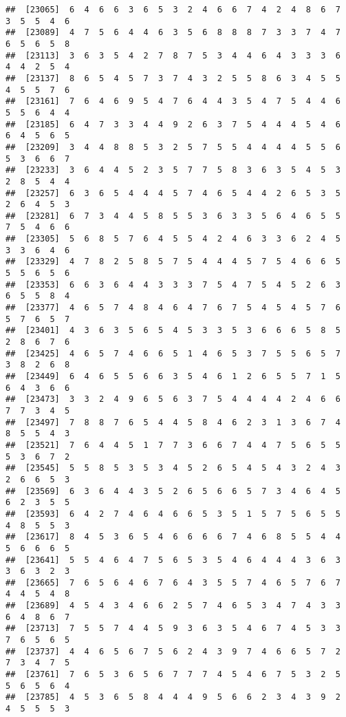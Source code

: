 \documentclass[
]{book}
\begin{document}
\begin{verbatim}
##  [23065]  6  4  6  6  3  6  5  3  2  4  6  6  7  4  2  4  8  6  7  3  5  5  4  6
##  [23089]  4  7  5  6  4  4  6  3  5  6  8  8  8  7  3  3  7  4  7  6  5  6  5  8
##  [23113]  3  6  3  5  4  2  7  8  7  5  3  4  4  6  4  3  3  3  6  4  4  2  5  4
##  [23137]  8  6  5  4  5  7  3  7  4  3  2  5  5  8  6  3  4  5  5  4  5  5  7  6
##  [23161]  7  6  4  6  9  5  4  7  6  4  4  3  5  4  7  5  4  4  6  5  5  6  4  4
##  [23185]  6  4  7  3  3  4  4  9  2  6  3  7  5  4  4  4  5  4  6  6  4  5  6  5
##  [23209]  3  4  4  8  8  5  3  2  5  7  5  5  4  4  4  4  5  5  6  5  3  6  6  7
##  [23233]  3  6  4  4  5  2  3  5  7  7  5  8  3  6  3  5  4  5  3  2  8  5  4  4
##  [23257]  6  3  6  5  4  4  4  5  7  4  6  5  4  4  2  6  5  3  5  2  6  4  5  3
##  [23281]  6  7  3  4  4  5  8  5  5  3  6  3  3  5  6  4  6  5  5  7  5  4  6  6
##  [23305]  5  6  8  5  7  6  4  5  5  4  2  4  6  3  3  6  2  4  5  3  3  6  4  6
##  [23329]  4  7  8  2  5  8  5  7  5  4  4  4  5  7  5  4  6  6  5  5  5  6  5  6
##  [23353]  6  6  3  6  4  4  3  3  3  7  5  4  7  5  4  5  2  6  3  6  5  5  8  4
##  [23377]  4  6  5  7  4  8  4  6  4  7  6  7  5  4  5  4  5  7  6  5  7  6  5  7
##  [23401]  4  3  6  3  5  6  5  4  5  3  3  5  3  6  6  6  5  8  5  2  8  6  7  6
##  [23425]  4  6  5  7  4  6  6  5  1  4  6  5  3  7  5  5  6  5  7  3  8  2  6  8
##  [23449]  6  4  6  5  5  6  6  3  5  4  6  1  2  6  5  5  7  1  5  6  4  3  6  6
##  [23473]  3  3  2  4  9  6  5  6  3  7  5  4  4  4  4  2  4  6  6  7  7  3  4  5
##  [23497]  7  8  8  7  6  5  4  4  5  8  4  6  2  3  1  3  6  7  4  8  5  5  4  3
##  [23521]  7  6  4  4  5  1  7  7  3  6  6  7  4  4  7  5  6  5  5  5  3  6  7  2
##  [23545]  5  5  8  5  3  5  3  4  5  2  6  5  4  5  4  3  2  4  3  2  6  6  5  3
##  [23569]  6  3  6  4  4  3  5  2  6  5  6  6  5  7  3  4  6  4  5  6  2  3  5  5
##  [23593]  6  4  2  7  4  6  4  6  6  5  3  5  1  5  7  5  6  5  5  4  8  5  5  3
##  [23617]  8  4  5  3  6  5  4  6  6  6  6  7  4  6  8  5  5  4  4  5  6  6  6  5
##  [23641]  5  5  4  6  4  7  5  6  5  3  5  4  6  4  4  4  3  6  3  3  6  3  2  3
##  [23665]  7  6  5  6  4  6  7  6  4  3  5  5  7  4  6  5  7  6  7  4  4  5  4  8
##  [23689]  4  5  4  3  4  6  6  2  5  7  4  6  5  3  4  7  4  3  3  6  4  8  6  7
##  [23713]  7  5  5  7  4  4  5  9  3  6  3  5  4  6  7  4  5  3  3  7  6  5  6  5
##  [23737]  4  4  6  5  6  7  5  6  2  4  3  9  7  4  6  6  5  7  2  7  3  4  7  5
##  [23761]  7  6  5  3  6  5  6  7  7  7  4  5  4  6  7  5  3  2  5  5  6  5  6  4
##  [23785]  4  5  3  6  5  8  4  4  4  9  5  6  6  2  3  4  3  9  2  4  5  5  5  3

\end{verbatim}
\end{document}
